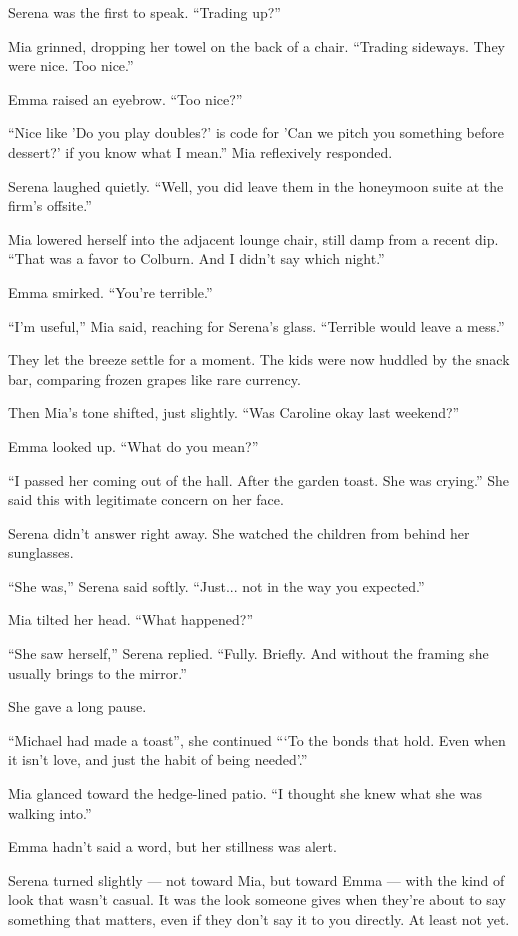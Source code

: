 Serena was the first to speak. ``Trading up?''

Mia grinned, dropping her towel on the back of a chair. ``Trading sideways. They were nice. Too nice.''

Emma raised an eyebrow. ``Too nice?''

``Nice like 'Do you play doubles?' is code for 'Can we pitch you something before dessert?' if you know what I mean.''
Mia reflexively responded.

Serena laughed quietly. ``Well, you did leave them in the honeymoon suite at the firm’s offsite.''

Mia lowered herself into the adjacent lounge chair, still damp from a recent dip. ``That was a favor to Colburn. 
And I didn’t say which night.''

Emma smirked. ``You’re terrible.''

``I’m useful,'' Mia said, reaching for Serena’s glass. ``Terrible would leave a mess.''

They let the breeze settle for a moment. The kids were now huddled by the snack bar, comparing frozen grapes 
like rare currency.

Then Mia’s tone shifted, just slightly. ``Was Caroline okay last weekend?''

Emma looked up. ``What do you mean?''

``I passed her coming out of the hall. After the garden toast. She was crying.'' She said this with legitimate 
concern on her face.

Serena didn’t answer right away. She watched the children from behind her sunglasses.

``She was,'' Serena said softly. ``Just... not in the way you expected.''

Mia tilted her head. ``What happened?''

``She saw herself,'' Serena replied. ``Fully. Briefly. And without the framing she usually brings to 
the mirror.''

She gave a long pause.

``Michael had made a toast'', she continued 
```To the bonds that hold. Even when it isn’t love, and just the habit of being needed'.''

Mia glanced toward the hedge-lined patio. ``I thought she knew what she was walking into.''

Emma hadn’t said a word, but her stillness was alert.

Serena turned slightly — not toward Mia, but toward Emma — with the kind of look that wasn’t casual.
It was the look someone gives when they’re about to say something that matters, even if they don’t say it to you directly.
At least not yet.

